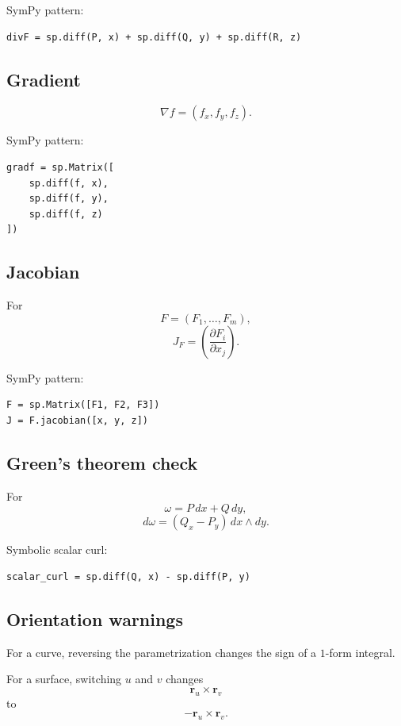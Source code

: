 SymPy pattern:

\begin{verbatim}
divF = sp.diff(P, x) + sp.diff(Q, y) + sp.diff(R, z)
\end{verbatim}

\subsection*{Gradient}

\[
\boxed{
    \nabla f=(f_x,f_y,f_z).
}
\]

SymPy pattern:

\begin{verbatim}
gradf = sp.Matrix([
    sp.diff(f, x),
    sp.diff(f, y),
    sp.diff(f, z)
])
\end{verbatim}

\subsection*{Jacobian}

For
\[
    F=(F_1,\ldots,F_m),
\]
\[
\boxed{
    J_F=\left(\frac{\partial F_i}{\partial x_j}\right).
}
\]

SymPy pattern:

\begin{verbatim}
F = sp.Matrix([F1, F2, F3])
J = F.jacobian([x, y, z])
\end{verbatim}

\subsection*{Green's theorem check}

For
\[
    \omega=P\,dx+Q\,dy,
\]
\[
\boxed{
    d\omega=(Q_x-P_y)\,dx\wedge dy.
}
\]

Symbolic scalar curl:

\begin{verbatim}
scalar_curl = sp.diff(Q, x) - sp.diff(P, y)
\end{verbatim}

\subsection*{Orientation warnings}

For a curve, reversing the parametrization changes the sign of a \(1\)-form integral.

For a surface, switching \(u\) and \(v\) changes
\[
    \mathbf r_u\times\mathbf r_v
\]
to
\[
    -\mathbf r_u\times\mathbf r_v.
\]

